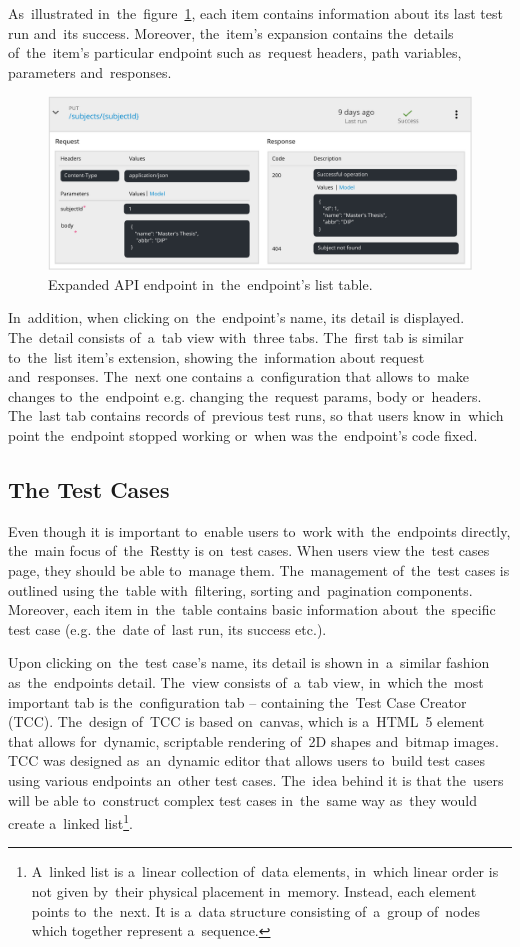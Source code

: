 As~illustrated in~the~figure~\ref{fig-endpoints}, each item contains information about its last test run and~its success.
Moreover, the~item's expansion contains the~details of~the~item's particular
endpoint such as~request headers, path variables, parameters and~responses.

\begin{figure}[!hbt]
	\centering
	\includegraphics[scale=0.7]{./designs/api-list.pdf}
	\caption{Expanded API endpoint in~the~endpoint's list table.}
	\label{fig-endpoints}
\end{figure}

In~addition, when clicking on~the~endpoint's name, its detail is displayed.
The~detail consists of~a~tab view with~three tabs. The~first tab is similar to~the~list item's extension,
showing the~information about request and~responses. The~next one contains a~configuration that
allows to~make changes to~the~endpoint e.g. changing the~request params, body or~headers. The~last
tab contains records of~previous test runs, so that users know in~which point the~endpoint stopped working
or~when was the~endpoint's code fixed.

\subsection{The Test Cases}
Even though it is important to~enable users to~work with~the~endpoints directly,
the~main focus of~the~Restty is on~test cases. When users view the~test cases page,
they should be able to~manage them. The~management of~the~test cases is outlined using
the~table with~filtering, sorting and~pagination components. Moreover, each item in~the~table
contains basic information about~the~specific test case (e.g. the~date of~last run, its success etc.).

Upon clicking on~the~test case's name, its detail is shown in~a~similar fashion as~the~endpoints detail.
The~view consists of~a~tab view, in~which the~most important tab is the~configuration tab -- containing
the~Test Case Creator (TCC). The~design of~TCC is based on~canvas, which is a~HTML~5 element that allows
for~dynamic, scriptable rendering of~2D shapes and~bitmap images. TCC was designed as~an~dynamic editor that
allows users to~build test cases using various endpoints an~other test cases. The~idea behind it is that the~users
will be able to~construct complex test cases in~the~same way as~they would create a~linked list\footnote{
A~linked list is a~linear collection of~data elements, in~which linear order is not given by~their
physical placement in~memory. Instead, each element points to~the~next. It is a~data structure
consisting of~a~group of~nodes which together represent a~sequence.}.

